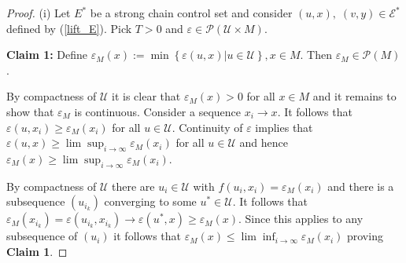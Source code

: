 \documentclass[10pt,a4paper]{amsart}
\begin{document}
\begin{proof}
(i) Let $E^{\ast}$ be a strong chain control set and consider
$(u,x),\;(v,y)\in\mathcal{E}^{\ast}$ defined by (\ref{lift_E}). Pick $T>0$ and
$\varepsilon\in\mathcal{P}(\mathcal{U}\times M)$.

\textbf{Claim 1:} Define $\varepsilon_{M}(x):=\min\left\{  \varepsilon
(u,x)\left\vert u\in\mathcal{U}\right.  \right\}  ,x\in M.$ Then
$\varepsilon_{M}\in\mathcal{P}(M)$.

By compactness of $\mathcal{U}$ it is clear that $\varepsilon_{M}(x)>0$ for
all $x\in M$ and it remains to show that $\varepsilon_{M}$ is continuous.
Consider a sequence $x_{i}\rightarrow x$. It follows that $\varepsilon
(u,x_{i})\geq\varepsilon_{M}(x_{i})$ for all $u\in\mathcal{U}$. Continuity of
$\varepsilon$ implies that $\varepsilon(u,x)\geq\lim\sup_{i\rightarrow\infty
}\varepsilon_{M}(x_{i})$ for all $u\in\mathcal{U}$ and hence $\varepsilon
_{M}(x)\geq\lim\sup_{i\rightarrow\infty}\varepsilon_{M}(x_{i})$.

By compactness of $\mathcal{U}$ there are $u_{i}\in\mathcal{U}$ with
$f(u_{i},x_{i})=\varepsilon_{M}(x_{i})$ and there is a subsequence $(u_{i_{k}%
})$ converging to some $u^{\ast}\in\mathcal{U}$. It follows that
$\varepsilon_{M}(x_{i_{k}})=\varepsilon(u_{i_{k}},x_{i_{k}})\rightarrow
\varepsilon(u^{\ast},x)\geq\varepsilon_{M}(x)$. Since this applies to any
subsequence of $(u_{i})$ it follows that $\varepsilon_{M}(x)\leq\lim
\inf_{i\rightarrow\infty}\varepsilon_{M}(x_{i})$ proving \textbf{Claim 1}.


\end{proof}
\end{document}
